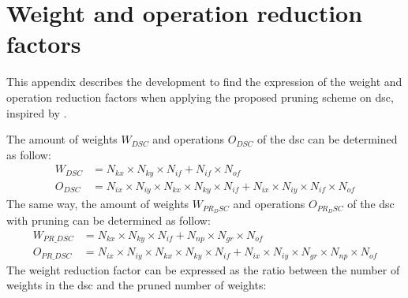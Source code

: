 \chapter{Weight and operation reduction factors} \label{appendix:factor}
This appendix describes the development to find the expression of the weight and operation reduction factors when applying the proposed pruning scheme on \acrshort{dsc}, inspired by \textcite{bai_cnn_2018, liu_fpga-based_2019}.

The amount of weights $W_{DSC}$ and operations $O_{DSC}$ of the \acrshort{dsc} can be determined as follow:
%
\begin{align*}
    W_{DSC} &= N_{kx} \times N_{ky} \times N_{if} + N_{if} \times N_{of} \\
    O_{DSC} &= N_{ix} \times N_{iy} \times N_{kx} \times N_{ky} \times N_{if} + N_{ix} \times N_{iy} \times N_{if} \times N_{of}
\end{align*}
%
The same way, the amount of weights $W_{PR_DSC}$ and operations $O_{PR_DSC}$ of the \acrshort{dsc} with pruning can be determined as follow:
%
\begin{align*}
    W_{PR\_DSC} &= N_{kx} \times N_{ky} \times N_{if} + N_{np} \times N_{gr} \times N_{of}\\
    O_{PR\_DSC} &= N_{ix} \times N_{iy} \times N_{kx} \times N_{ky} \times N_{if} + N_{ix} \times N_{iy} \times N_{gr} \times N_{np} \times N_{of} 
\end{align*}
%
The weight reduction factor can be expressed as the ratio between the number of weights in the \acrshort{dsc} and the pruned number of weights:

